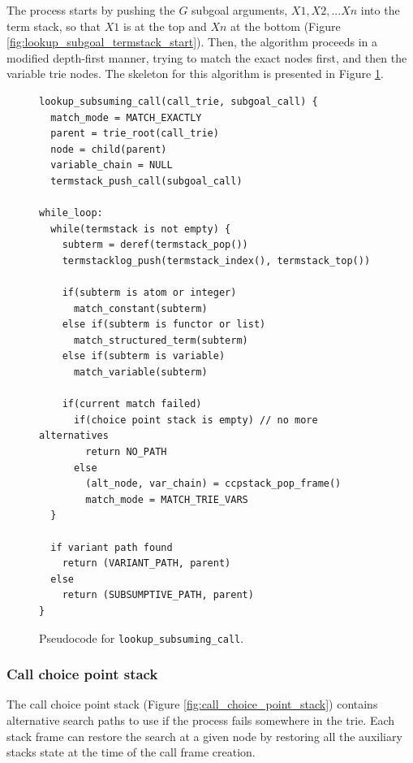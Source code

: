 The process starts by pushing the $G$ subgoal arguments, $X1, X2, ...Xn$ into the term stack, so that $X1$ is at the top
and $Xn$ at the bottom (Figure \ref{fig:lookup_subgoal_termstack_start}).
Then, the algorithm proceeds in a modified depth-first manner, trying to match the exact nodes first, and then
the variable trie nodes. The skeleton for this algorithm is presented in Figure \ref{fig:lookup_subsuming_call}.

\begin{figure}[ht]
\begin{Verbatim}[fontsize=\small]
lookup_subsuming_call(call_trie, subgoal_call) {
  match_mode = MATCH_EXACTLY
  parent = trie_root(call_trie)
  node = child(parent)
  variable_chain = NULL
  termstack_push_call(subgoal_call)

while_loop:
  while(termstack is not empty) {
    subterm = deref(termstack_pop())
    termstacklog_push(termstack_index(), termstack_top())
  
    if(subterm is atom or integer)
      match_constant(subterm)
    else if(subterm is functor or list)
      match_structured_term(subterm)
    else if(subterm is variable)
      match_variable(subterm)
  
    if(current match failed)
      if(choice point stack is empty) // no more alternatives
        return NO_PATH
      else
        (alt_node, var_chain) = ccpstack_pop_frame()
        match_mode = MATCH_TRIE_VARS
  }
  
  if variant path found
    return (VARIANT_PATH, parent)
  else
    return (SUBSUMPTIVE_PATH, parent)
}
\end{Verbatim}
\caption{Pseudo\-code for \texttt{lookup\_subsuming\_call}.}
\label{fig:lookup_subsuming_call}
\end{figure}

\subsubsection{Call choice point stack}

The call choice point stack (Figure \ref{fig:call_choice_point_stack}) contains alternative
search paths to use if the process fails somewhere in the trie.
Each stack frame can restore the search at a given node by restoring all the auxiliary stacks state at the time
of the call frame creation.

